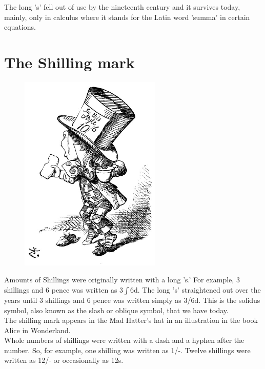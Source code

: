 \documentclass{article}
\begin{document}
The long 's' fell out of use by the nineteenth century and it survives today, mainly, only in calculus where it stands for the Latin word 'summa' in certain equations.\\

\newpage

\section*{The Shilling mark}

\begin{figure}
\includegraphics[width=0.6\textwidth]{madhatter}
\end{figure}

Amounts of Shillings were originally written with a long 's.' For example, 3 shillings and 6 pence was written as 3$\int$6d. The long 's' straightened out over the years until 3 shillings and 6 pence was written simply as 3/6d. This is the solidus symbol, also known as the slash or oblique symbol, that we have today.\\

The shilling mark appears in the Mad Hatter's hat in an illustration in the book Alice in Wonderland.\\

Whole numbers of shillings were written with a dash and a hyphen after the number. So, for example, one shilling was written as 1/-. Twelve shillings were written as 12/- or occasionally as 12s.
\end{document}
